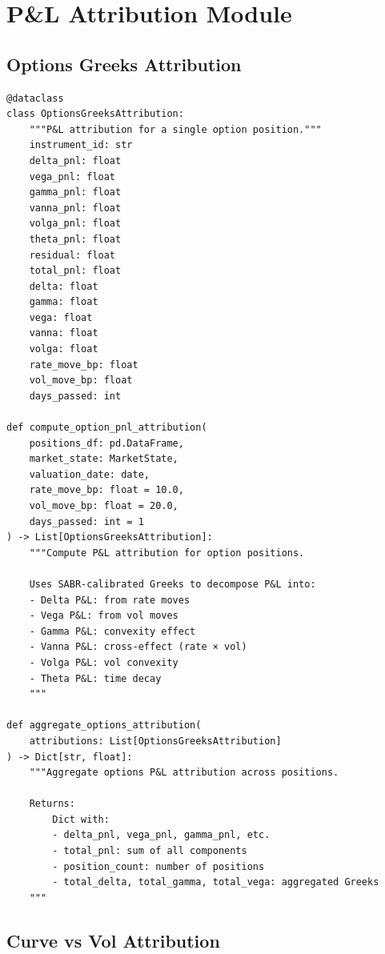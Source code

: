 \documentclass[12pt,a4paper]{report}
\begin{document}
\section{P\&L Attribution Module}

\subsection{Options Greeks Attribution}

\begin{lstlisting}
@dataclass
class OptionsGreeksAttribution:
    """P&L attribution for a single option position."""
    instrument_id: str
    delta_pnl: float
    vega_pnl: float
    gamma_pnl: float
    vanna_pnl: float
    volga_pnl: float
    theta_pnl: float
    residual: float
    total_pnl: float
    delta: float
    gamma: float
    vega: float
    vanna: float
    volga: float
    rate_move_bp: float
    vol_move_bp: float
    days_passed: int

def compute_option_pnl_attribution(
    positions_df: pd.DataFrame,
    market_state: MarketState,
    valuation_date: date,
    rate_move_bp: float = 10.0,
    vol_move_bp: float = 20.0,
    days_passed: int = 1
) -> List[OptionsGreeksAttribution]:
    """Compute P&L attribution for option positions.
    
    Uses SABR-calibrated Greeks to decompose P&L into:
    - Delta P&L: from rate moves
    - Vega P&L: from vol moves
    - Gamma P&L: convexity effect
    - Vanna P&L: cross-effect (rate × vol)
    - Volga P&L: vol convexity
    - Theta P&L: time decay
    """

def aggregate_options_attribution(
    attributions: List[OptionsGreeksAttribution]
) -> Dict[str, float]:
    """Aggregate options P&L attribution across positions.
    
    Returns:
        Dict with:
        - delta_pnl, vega_pnl, gamma_pnl, etc.
        - total_pnl: sum of all components
        - position_count: number of positions
        - total_delta, total_gamma, total_vega: aggregated Greeks
    """
\end{lstlisting}

\subsection{Curve vs Vol Attribution}
\end{document}
